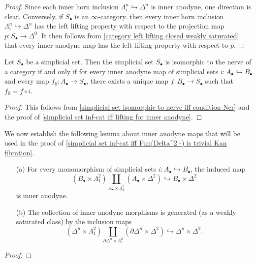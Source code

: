 \begin{proof}
Since each inner horn inclusion $\Lambda^n_i\hookrightarrow\Delta^n$ is inner anodyne, one direction is clear. Conversely, if $S_\bullet$ is an $\infty$-category. then every inner horn inclusion $\Lambda_i^n\hookrightarrow\Delta^n$ has the left lifting property with respect to the projection map $p:S_\bullet\to\Delta^0$. It then follows from \cref{category left lifting closed weakly saturated} that every inner anodyne map has the left lifting property with respect to $p$.
\end{proof}
\begin{corollary}\label{simplicial set nerve of cat iff unique lifting for inner anodyne}
Let $S_\bullet$ be a simplicial set. Then the simplicial set $S_\bullet$ is isomorphic to the nerve of a category if and only if for every inner anodyne map of simplicial sets $i:A_\bullet\hookrightarrow B_\bullet$ and every map $f_0:A_\bullet\to S_\bullet$, there exists a unique map $f:B_\bullet\to S_\bullet$ such that $f_0=f\circ i$.
\end{corollary}
\begin{proof}
This follows from \cref{simplicial set isomorphic to nerve iff condition Ner} and the proof of \cref{simplicial set inf-cat iff lifting for inner anodyne}.
\end{proof}
We now establish the following lemma about inner anodyne maps that will be used in the proof of \cref{simplicial set inf-cat iff Fun(Delta^2 -) is trivial Kan fibration}.
\begin{lemma}\label{simplicial set inner anodyne generator}
\mbox{}
\begin{itemize}
\item[(a)] For every monomorphism of simplicial sets $i:A_\bullet\hookrightarrow B_\bullet$, the induced map
\[(B_\bullet\times\Lambda^2_1)\coprod_{A_\bullet\times\Lambda^2_1}(A_\bullet\times\Delta^2)\hookrightarrow B_\bullet\times\Delta^2\]
is inner anodyne.
\item[(b)] The collection of inner anodyne morphisms is generated (as a weakly saturated class) by the inclusion maps
\[(\Delta^n\times\Lambda^2_1)\coprod_{\partial\Delta^n\times\Lambda^2_1}(\partial\Delta^n\times\Delta^2)\hookrightarrow\Delta^n\times\Delta^2.\] 
\end{itemize}
\end{lemma}
\begin{proof}

\end{proof}
